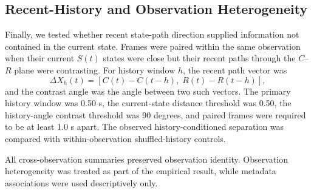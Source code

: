 \subsection{Recent-History and Observation Heterogeneity}

Finally, we tested whether recent state-path direction supplied information
not contained in the current state. Frames were paired within the same
observation when their current $S(t)$ states were close but their
recent paths through the $C$--$R$ plane were contrasting. For history window
$h$, the recent path vector was
\begin{equation}
\Delta X_h(t)=
\left[C(t)-C(t-h),\; R(t)-R(t-h)\right],
\end{equation}
and the contrast angle was the angle between two such vectors. The primary
history window was 0.50 s, the current-state distance threshold was 0.50, the
history-angle contrast threshold was 90 degrees, and paired frames were
required to be at least 1.0 s apart. The observed history-conditioned
separation was compared with within-observation shuffled-history controls.

All cross-observation summaries preserved observation identity. Observation
heterogeneity was treated as part of the empirical result, while metadata
associations were used descriptively only.
